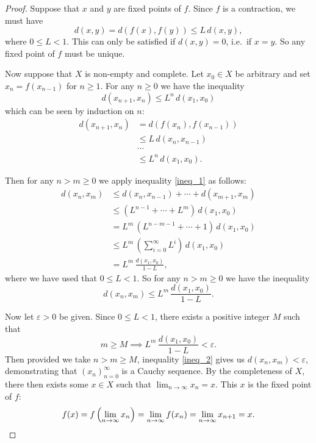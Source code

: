 \documentclass[12pt]{article}
\newcommand{\newp}{\vspace{5mm}}
\theoremstyle{definition}
\begin{document}
\begin{proof}
Suppose that \( x \) and \( y \) are fixed points of \( f \). Since \( f \) is a contraction, we must have
\[
    d(x, y) = d(f(x), f(y)) \leq L \, d(x, y),
\]
where \( 0 \leq L < 1 \). This can only be satisfied if \( d(x, y) = 0 \), i.e.\ if \( x = y \). So any fixed point of \( f \) must be unique.

\newp

Now suppose that \( X \) is non-empty and complete. Let \( x_0 \in X \) be arbitrary and set \( x_n = f(x_{n-1}) \) for \( n \geq 1 \). For any \( n \geq 0 \) we have the inequality
\begin{equation}
\label{ineq_1}
    \boxed{ d(x_{n+1}, x_n) \leq L^n \, d(x_1, x_0)}
\end{equation}
which can be seen by induction on \( n \):
\begin{align*}
    d(x_{n+1}, x_n) &= d(f(x_n), f(x_{n-1})) \\
    &\leq L \, d(x_n, x_{n-1}) \\
    &\cdots \\
    &\leq L^n \, d(x_1, x_0).
\end{align*}

Then for any \( n > m \geq 0 \) we apply inequality \eqref{ineq_1} as follows:
\begin{align*}
    d(x_n, x_m) &\leq d(x_n, x_{n-1}) + \cdots + d(x_{m+1}, x_m) \\
    &\leq (L^{n-1} + \cdots + L^m) \, d(x_1, x_0) \\
    &= L^m \, (L^{n-m-1} + \cdots + 1) \, d(x_1, x_0) \\
    &\leq L^m \, \left( \sum_{i=0}^{\infty} L^i \right) \, d(x_1, x_0) \\
    &= L^m \, \frac{d(x_1, x_0)}{1 - L},
\end{align*}
where we have used that \( 0 \leq L < 1 \). So for any \( n > m \geq 0 \) we have the inequality
\begin{equation}
\label{ineq_2}
    \boxed{ d(x_n, x_m) \leq L^m \, \frac{d(x_1, x_0)}{1 - L}.}
\end{equation}

Now let \( \varepsilon > 0 \) be given. Since \( 0 \leq L < 1 \), there exists a positive integer \( M \) such that
\[
    m \geq M \implies L^m \, \frac{d(x_1, x_0)}{1 - L} < \varepsilon.
\]
Then provided we take \( n > m \geq M \), inequality \eqref{ineq_2} gives us \( d(x_n, x_m) < \varepsilon \), demonstrating that \( (x_n)_{n=0}^{\infty} \) is a Cauchy sequence. By the completeness of \( X \), there then exists some \( x \in X \) such that \( \lim_{n\to\infty} x_n = x \). This \( x \) is the fixed point of \( f \):
\[
    f(x) = f\left( \lim_{n\to\infty} x_n \right) = \lim_{n\to\infty} f(x_n) = \lim_{n\to\infty} x_{n+1} = x. \qedhere
\]
\end{proof}
\end{document}

